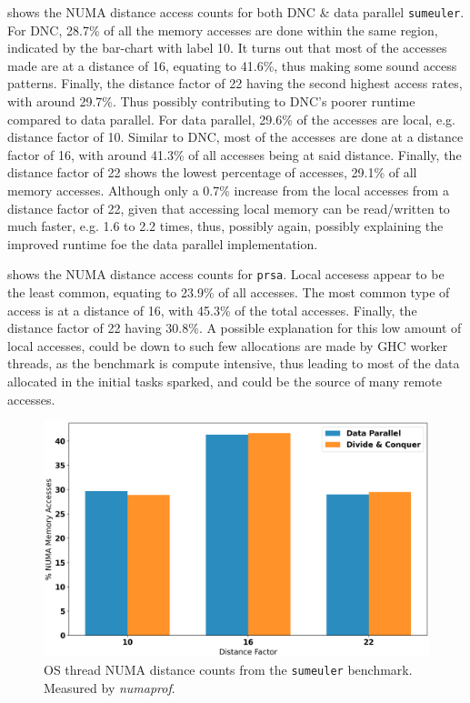 \documentclass{paper}\usepackage{graphicx}
\begin{document}
 shows the NUMA distance access counts for both DNC \& data parallel \lstinline{sumeuler}. For DNC, 28.7\% of all the memory accesses are done within the same region, indicated by the bar-chart with label 10. It turns out that most of the accesses made are at a distance of 16, equating to 41.6\%, thus making some sound access patterns. Finally, the distance factor of 22 having the second highest access rates, with around 29.7\%. Thus possibly contributing to DNC's poorer runtime compared to data parallel. For data parallel, 29.6\% of the accesses are local, e.g. distance factor of 10. Similar to DNC, most of the accesses are done at a distance factor of 16, with around 41.3\% of all accesses being at said distance. Finally, the distance factor of 22 shows the lowest percentage of accesses, 29.1\% of all memory accesses. Although only a 0.7\% increase from the local accesses from a distance factor of 22, given that accessing local memory can be read/written to much faster, e.g. 1.6 to 2.2 times, thus, possibly again, possibly explaining the improved runtime foe the data parallel implementation.

 shows the NUMA distance access counts for \lstinline{prsa}. Local accesess appear to be the least common, equating to 23.9\% of all accesses. The most common type of access is at a distance of 16, with 45.3\% of the total accesses. Finally, the distance factor of 22 having 30.8\%. A possible explanation for this low amount of local accesses, could be down to such few allocations are made by GHC worker threads, as the benchmark is compute intensive, thus leading to most of the data allocated in the initial tasks sparked, and could be the source of many remote accesses.

\begin{figure}[!htb]
    \centering
    \includegraphics[width=\linewidth]{Paper/images/sumeuler/sumeuler_dist.png}
    \caption{OS thread NUMA distance counts from the \lstinline{sumeuler} benchmark. Measured by \textit{numaprof}.}
    \label{fig:sumeuler_dist}
\end{figure}
\end{document}
